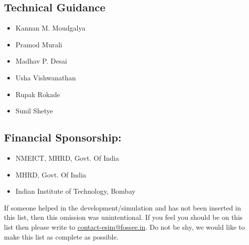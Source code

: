 \subsection*{Technical Guidance}
\begin{multicols}{2}
\begin{itemize}
    \item Kannan M. Moudgalya
    \item Pramod Murali
    \item Madhav P. Desai
    \item Usha Vishwanathan
    \item Rupak Rokade
    \item Sunil Shetye
\end{itemize}
\end{multicols}
\subsection*{Financial Sponsorship:}
\begin{multicols}{2}
\begin{itemize}
    \item NMEICT, MHRD, Govt. Of India
    \item MHRD, Govt. Of India
    \item Indian Institute of Technology, Bombay
\end{itemize}
\end{multicols}

If someone helped in the development/simulation and has not been inserted in this list, then this omission was unintentional. If you feel you should be on this list then please write to \href{mailto:contact-esim@fossee.in}{contact-esim@fossee.in}.  Do not be shy, we  would  like  to  make  this  list  as  complete  as possible.
